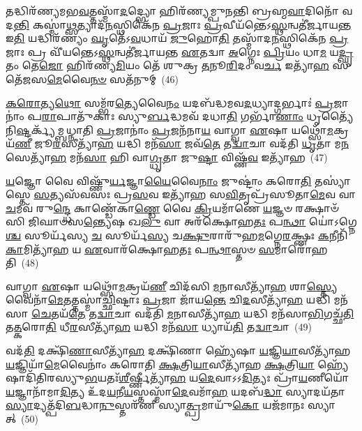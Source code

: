 {\anuvakamend[{𑌨𑌿𑌷𑍍𑌕𑍍𑌰𑍀᳴𑌣𑍀\-\ul{𑌷𑍍𑌵} 𑌦𑌕𑍍𑌷𑌿᳴𑌣𑌾𑌭𑌿𑌶𑍍𑌚 𑌵𑌦\-\ul{𑌨𑍍𑌤𑌿} 𑌮𑌨𑍍𑌯᳴𑌨𑍍𑌤𑍇 𑌗\-\ul{𑌨𑍍𑌧}\-𑌰𑍍𑌵𑍇𑌭𑍍𑌯𑍋᳴ \ul{𑌬}\-𑌹𑍁𑌤᳴𑌯𑌾𑌃 𑌪𑌿\-\ul{𑌙𑍍𑌗𑌾}\-𑌕𑍍𑌷𑍍𑌯𑌾 𑌦𑌶᳴ 𑌚}]}%

𑌤𑌦𑍍𑌧𑌿𑌰᳴𑌣𑍍𑌯𑌮𑌭\-\ul{𑌵}\-𑌤𑍍𑌤𑌸𑍍𑌮𑌾᳴\-\ul{𑌦}\-𑌦𑍍𑌭𑍍𑌯𑍋 𑌹𑌿𑌰᳴𑌣𑍍𑌯𑌮𑍍𑌪𑍁𑌨𑌨𑍍𑌤𑌿 𑌬𑍍𑌰𑌹𑍍𑌮\-\ul{𑌵𑌾}\-𑌦𑌿𑌨𑍋᳴ 𑌵𑌦\-\ul{𑌨𑍍𑌤𑌿} 𑌕𑌸𑍍𑌮𑌾॑\-\ul{𑌥𑍍𑌸}\-𑌤𑍍𑌯𑌾𑌦᳴\-\ul{𑌨}\-𑌸𑍍𑌥𑌿𑌕𑍇᳴𑌨 \ul{𑌪𑍍𑌰}\-𑌜𑌾𑌃 \ul{𑌪𑍍𑌰}\-𑌵𑍀𑌯᳴𑌨𑍍𑌤𑍇\-𑌽\-\-\ul{𑌸𑍍𑌥}\-𑌨𑍍𑌵𑌤𑍀॑𑌰𑍍𑌜𑌾𑌯\-\ul{𑌨𑍍𑌤} 𑌇\-\ul{𑌤𑌿} 𑌯𑌦𑍍𑌧𑌿𑌰᳴𑌣𑍍𑌯𑌂 \ul{𑌘𑍃}\-𑌤𑍇᳴\-𑌽\-\ul{𑌵}\-𑌧𑌾𑌯᳴ \ul{𑌜𑍁}\-𑌹𑍋\-\ul{𑌤𑌿} 𑌤𑌸𑍍𑌮𑌾᳴𑌦\-\ul{𑌨}\-𑌸𑍍𑌥𑌿𑌕𑍇᳴𑌨 \ul{𑌪𑍍𑌰}\-𑌜𑌾𑌃 𑌪𑍍𑌰 𑌵𑍀᳴𑌯𑌨𑍍𑌤𑍇\-𑌽\-\ul{𑌸𑍍𑌥}\-𑌨𑍍𑌵𑌤𑍀॑𑌰𑍍𑌜𑌾𑌯𑌨𑍍𑌤 \ul{𑌏}\-𑌤𑌦𑍍𑌵𑌾 \ul{𑌅}\-𑌗𑍍𑌨𑍇𑌃 \ul{𑌪𑍍𑌰𑌿}\-𑌯𑌂 𑌧𑌾\-\ul{𑌮} 𑌯\-\ul{𑌦𑍍𑌘𑍃}\-𑌤𑌂 𑌤𑍇\-\ul{𑌜𑍋} 𑌹𑌿𑌰᳴𑌣𑍍𑌯\-\ul{𑌮𑌿}\-𑌯𑌂 𑌤𑍇᳴ 𑌶𑍁𑌕𑍍𑌰 \ul{𑌤}\-𑌨𑍂\-\ul{𑌰𑌿}\-𑌦𑌂 𑌵\-\ul{𑌰𑍍𑌚} 𑌇𑌤𑍍𑌯𑌾᳴\-\ul{𑌹} 𑌸𑌤𑍇᳴𑌜𑌸\-\ul{𑌮𑍇}\-𑌵𑍈\-\ul{𑌨}\-\-\ul{𑍞} 𑌸𑌤᳴𑌨𑍁𑌮𑍍~(46)

\-\ul{𑌕}\-\-\ul{𑌰𑍋}\-𑌤𑍍𑌯\-\ul{𑌥𑍋} 𑌸𑌮𑍍𑌭᳴𑌰\-\ul{𑌤𑍍𑌯𑍇}\-𑌵𑍈\-\ul{𑌨𑌂} 𑌯𑌦𑌬᳴𑌦𑍍𑌧𑌮𑌵\-\ul{𑌦}\-𑌧𑍍𑌯𑌾𑌦𑍍𑌗𑌰𑍍𑌭𑌾𑌃॑ \ul{𑌪𑍍𑌰}\-𑌜𑌾𑌨𑌾𑌂॑ 𑌪\-\ul{𑌰𑌾}\-𑌪𑌾𑌤𑍁᳴𑌕𑌾𑌃 𑌸𑍍𑌯𑍁\-\ul{𑌰𑍍𑌬}\-𑌦𑍍𑌧𑌮𑌵᳴ 𑌦𑌧𑌾\-\ul{𑌤𑌿} 𑌗𑌰𑍍𑌭𑌾᳴\-\ul{𑌣𑌾𑌂} 𑌧𑍃𑌤𑍍𑌯𑍈᳴ 𑌨𑌿\-\ul{𑌷𑍍𑌟}\-𑌰𑍍𑌕𑍍𑌯᳴𑌮𑍍𑌬𑌧𑍍𑌨𑌾𑌤𑌿 \ul{𑌪𑍍𑌰}\-𑌜𑌾𑌨𑌾𑌂॑ \ul{𑌪𑍍𑌰}\-𑌜𑌨᳴𑌨𑌾\-\ul{𑌯} 𑌵𑌾𑌗𑍍𑌵𑌾 \ul{𑌏}\-𑌷𑌾 𑌯𑌥𑍍𑌸𑍋᳴\-\ul{𑌮}\-𑌕𑍍𑌰𑌯᳴\-\ul{𑌣𑍀} 𑌜𑍂\-\ul{𑌰}\-𑌸𑍀𑌤𑍍𑌯𑌾᳴\-\ul{𑌹} 𑌯𑌦𑍍𑌧𑌿 𑌮𑌨᳴\-\ul{𑌸𑌾} 𑌜𑌵᳴\-\ul{𑌤𑍇} 𑌤\-\ul{𑌦𑍍𑌵𑌾}\-𑌚𑌾 𑌵𑌦᳴𑌤𑌿 \ul{𑌧𑍃}\-𑌤𑌾 𑌮\-\ul{𑌨}\-𑌸𑍇𑌤𑍍𑌯𑌾᳴\-\ul{𑌹} 𑌮𑌨᳴\-\ul{𑌸𑌾} 𑌹𑌿 𑌵𑌾\-\ul{𑌗𑍍𑌧𑍃}\-𑌤𑌾 𑌜𑍁\-\ul{𑌷𑍍𑌟𑌾} 𑌵𑌿𑌷𑍍𑌣᳴\-\ul{𑌵} 𑌇𑌤𑍍𑌯𑌾᳴𑌹~(47)

\-\ul{𑌯}\-𑌜𑍍𑌞𑍋 𑌵𑍈 𑌵𑌿𑌷𑍍𑌣𑍁᳴\-\ul{𑌰𑍍𑌯}\-𑌜𑍍𑌞𑌾\-\ul{𑌯𑍈}\-𑌵𑍈\-\ul{𑌨𑌾𑌂} 𑌜𑍁𑌷𑍍𑌟𑌾𑌂॑ 𑌕𑌰𑍋\-\ul{𑌤𑌿} 𑌤𑌸𑍍𑌯𑌾॑𑌸𑍍𑌤𑍇 \ul{𑌸}\-𑌤𑍍𑌯𑌸᳴𑌵𑌸𑌃 𑌪𑍍𑌰\-\ul{𑌸}\-𑌵 𑌇𑌤𑍍𑌯𑌾᳴𑌹 𑌸\-\ul{𑌵𑌿}\-𑌤𑍃𑌪𑍍𑌰᳴𑌸𑍂𑌤𑌾\-\ul{𑌮𑍇}\-𑌵 𑌵𑌾\-\ul{𑌚}\-𑌮𑌵᳴ 𑌰𑍁\-\ul{𑌨𑍍𑌦𑍍𑌧𑍇} 𑌕𑌾𑌣𑍍𑌡𑍇᳴𑌕𑌾\-\ul{𑌣𑍍𑌡𑍇} 𑌵𑍈 \ul{𑌕𑍍𑌰𑌿}\-𑌯𑌮𑌾᳴𑌣𑍇 \ul{𑌯}\-𑌜𑍍𑌞𑍞 𑌰𑌕𑍍𑌷𑌾𑍞᳴𑌸𑌿 𑌜𑌿𑌘𑌾𑍞𑌸\-\ul{𑌨𑍍𑌤𑍍𑌯𑍇}\-𑌷 𑌖\-\ul{𑌲𑍁} 𑌵𑌾 𑌅𑌰᳴𑌕𑍍𑌷𑍋𑌹\-\ul{𑌤𑌃} 𑌪\-\ul{𑌨𑍍𑌥𑌾} 𑌯𑍋॑\-𑌽𑌗𑍍𑌨𑍇\-\ul{𑌶𑍍𑌚} 𑌸𑍂𑌰𑍍𑌯᳴𑌸𑍍𑌯 \ul{𑌚} 𑌸𑍂𑌰𑍍𑌯᳴\-\ul{𑌸𑍍𑌯} 𑌚\-\ul{𑌕𑍍𑌷𑍁}\-𑌰𑌾𑌰𑍁᳴𑌹\-\ul{𑌮}\-𑌗𑍍𑌨𑍇\-\ul{𑌰}\-𑌕𑍍𑌷𑍍𑌣𑌃 \ul{𑌕}\-𑌨𑍀𑌨𑌿᳴\-\ul{𑌕𑌾}\-𑌮𑌿𑌤𑍍𑌯𑌾᳴\-\ul{𑌹} 𑌯 \ul{𑌏}\-𑌵𑌾𑌰᳴𑌕𑍍𑌷𑍋𑌹\-\ul{𑌤𑌃} 𑌪\-\ul{𑌨𑍍𑌥𑌾}\-𑌸𑍍𑌤𑍞 \ul{𑌸}\-𑌮𑌾𑌰𑍋᳴𑌹𑌤𑌿~(48)

𑌵𑌾𑌗𑍍𑌵𑌾 \ul{𑌏}\-𑌷𑌾 𑌯𑌥𑍍𑌸𑍋᳴\-\ul{𑌮}\-𑌕𑍍𑌰𑌯᳴\-\ul{𑌣𑍀} 𑌚𑌿𑌦᳴𑌸𑌿 \ul{𑌮}\-𑌨𑌾𑌸𑍀𑌤𑍍𑌯𑌾᳴\-\ul{𑌹} 𑌶𑌾\-\ul{𑌸𑍍𑌤𑍍𑌯𑍇}\-𑌵𑍈𑌨𑌾᳴\-\ul{𑌮𑍇}\-𑌤𑌤𑍍𑌤𑌸𑍍𑌮𑌾॑\-\ul{𑌚𑍍𑌛𑌿}\-𑌷𑍍𑌟𑌾𑌃 \ul{𑌪𑍍𑌰}\-𑌜𑌾 𑌜𑌾᳴𑌯\-\ul{𑌨𑍍𑌤𑍇} 𑌚𑌿\-\ul{𑌦}\-𑌸𑍀𑌤𑍍𑌯𑌾᳴\-\ul{𑌹} 𑌯𑌦𑍍𑌧𑌿 𑌮𑌨᳴𑌸𑌾 \ul{𑌚𑍇}\-𑌤𑌯᳴\-\ul{𑌤𑍇} 𑌤\-\ul{𑌦𑍍𑌵𑌾}\-𑌚𑌾 𑌵𑌦᳴𑌤𑌿 \ul{𑌮}\-𑌨𑌾𑌸𑍀𑌤𑍍𑌯𑌾᳴\-\ul{𑌹} 𑌯𑌦𑍍𑌧𑌿 𑌮𑌨᳴𑌸𑌾\-\ul{𑌭𑌿}\-𑌗𑌚𑍍𑌛᳴\-\ul{𑌤𑌿} 𑌤\-\ul{𑌤𑍍𑌕}\-𑌰𑍋\-\ul{𑌤𑌿} 𑌧𑍀\-\ul{𑌰}\-𑌸𑍀𑌤𑍍𑌯𑌾᳴\-\ul{𑌹} 𑌯𑌦𑍍𑌧𑌿 𑌮𑌨᳴\-\ul{𑌸𑌾} 𑌧𑍍𑌯𑌾𑌯᳴\-\ul{𑌤𑌿} 𑌤\-\ul{𑌦𑍍𑌵𑌾}\-𑌚𑌾~(49)

𑌵𑌦᳴\-\ul{𑌤𑌿} 𑌦𑌕𑍍𑌷𑌿᳴\-\ul{𑌣𑌾}\-𑌸𑍀𑌤𑍍𑌯𑌾᳴\-\ul{𑌹} 𑌦𑌕𑍍𑌷𑌿᳴𑌣𑌾 𑌹𑍍𑌯𑍇᳴𑌷𑌾 \ul{𑌯}\-𑌜𑍍𑌞𑌿\-\ul{𑌯𑌾}\-𑌸𑍀𑌤𑍍𑌯𑌾᳴𑌹 \ul{𑌯}\-𑌜𑍍𑌞𑌿𑌯𑌾᳴\-\ul{𑌮𑍇}\-𑌵𑍈𑌨𑌾𑌂॑ 𑌕𑌰𑍋𑌤𑌿 \ul{𑌕𑍍𑌷}\-𑌤𑍍𑌰𑌿\-\ul{𑌯𑌾}\-𑌸𑍀𑌤𑍍𑌯𑌾᳴𑌹 \ul{𑌕𑍍𑌷}\-𑌤𑍍𑌰𑌿\-\ul{𑌯𑌾} 𑌹𑍍𑌯𑍇᳴𑌷𑌾𑌦𑌿᳴𑌤𑌿𑌰𑌸𑍍𑌯𑍁\-\ul{𑌭}\-𑌯𑌤𑌃᳴\-\ul{𑌶𑍀}\-𑌰𑍍\mbox{}𑌷𑍍𑌣𑍀𑌤𑍍𑌯𑌾᳴\-\ul{𑌹} 𑌯\-\ul{𑌦𑍇}\-𑌵𑌾𑌽𑌽\-\ul{𑌦𑌿}\-𑌤𑍍𑌯𑌃 𑌪𑍍𑌰𑌾᳴\-\ul{𑌯}\-𑌣𑍀𑌯𑍋᳴ \ul{𑌯}\-𑌜𑍍𑌞𑌾𑌨𑌾᳴𑌮𑌾\-\ul{𑌦𑌿}\-𑌤𑍍𑌯 𑌉᳴𑌦\-\ul{𑌯}\-𑌨𑍀\-\ul{𑌯}\-𑌸𑍍𑌤𑌸𑍍𑌮𑌾᳴\-\ul{𑌦𑍇}\-𑌵𑌮𑌾᳴\-\ul{𑌹} 𑌯𑌦𑌬᳴\-\ul{𑌦𑍍𑌧𑌾} 𑌸𑍍𑌯𑌾𑌦𑌯᳴𑌤𑌾 \ul{𑌸𑍍𑌯𑌾}\-𑌦𑍍𑌯𑌤𑍍𑌪᳴𑌦𑌿\-\ul{𑌬}\-𑌦𑍍𑌧𑌾\-\ul{𑌨𑍁}\-𑌸𑍍𑌤𑌰᳴𑌣𑍀 𑌸𑍍𑌯𑌾\-\ul{𑌤𑍍𑌪𑍍𑌰}\-𑌮𑌾𑌯𑍁᳴\-\ul{𑌕𑍋} 𑌯𑌜᳴𑌮𑌾𑌨𑌃 𑌸𑍍𑌯𑌾𑌤𑍍~(50)

